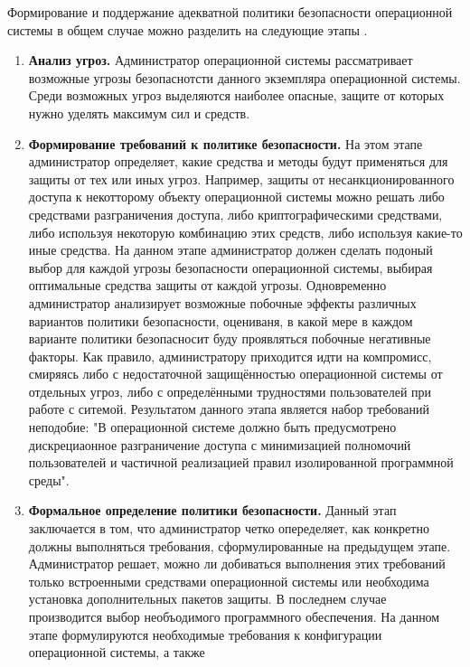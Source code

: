 Формирование и поддержание адекватной политики безопасности операционной системы в общем случае
можно разделить на следующие этапы \cite{os-protection}.
\begin{enumerate}
    \item \textbf{Анализ угроз.} Администратор операционной системы рассматривает возможные угрозы
        безопаснотсти данного экземпляра операционной системы. Среди возможных угроз выделяются
        наиболее опасные, защите от которых нужно уделять максимум сил и средств.
    \item \textbf{Формирование требований к политике безопасности.} На этом этапе администратор
        определяет, какие средства и методы будут применяться для защиты от тех или иных угроз.
        Например, защиты от несанкционированного доступа к некотторому объекту операционной системы
        можно решать либо средствами разграничения доступа, либо криптографическими средствами, либо
        используя некоторую комбинацию этих средств, либо используя какие-то иные средства. На данном
        этапе администратор должен сделать подоный выбор для каждой угрозы безопасности операционной
        системы, выбирая оптимальные средства защиты от каждой угрозы. Одновременно администратор
        анализирует возможные побочные эффекты различных вариантов политики безопасности, оцениваня,
        в какой мере в каждом варианте политики безопасносит буду проявляться побочные негативные
        факторы. Как правило, администратору приходится идти на компромисс, смиряясь либо с
        недостаточной защищённостью операционной системы от отдельных угроз, либо с определёнными
        трудностями пользователей при работе с ситемой. Результатом данного этапа является набор
        требований неподобие: "В операционной системе должно быть предусмотрено дискрециаонное
        разграничение доступа с минимизацией полномочий пользователей и частичной реализацией правил
        изолированной программной среды".
    \item \textbf{Формальное определение политики безопасности.} Данный этап заключается в том, что
        администратор четко опеределяет, как конкретно должны выполняться требования, сформулированные
        на предыдущем этапе. Администратор решает, можно ли добиваться выполнения этих требований
        только встроенными средствами операционной системы или необходима установка дополнительных
        пакетов защиты. В последнем случае производится выбор необъодимого программного обеспечения. На
        данном этапе формулируются необходимые требования к конфигурации операционной системы, а также

\end{enumerate}
